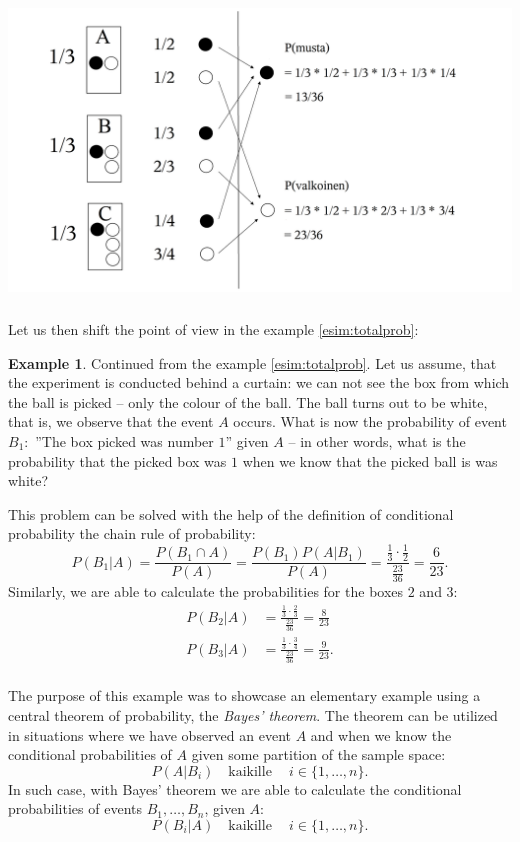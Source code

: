\documentclass[12pt,a4paper,leqno]{report}
\theoremstyle{plain}
\theoremstyle{definition}
\newtheorem{esim}[equation]{Example}
\begin{document}
\begin{center}
\includegraphics[height = 8cm]{bayes1.png}
\label{kuva:bayes}
\end{center}

Let us then shift the point of view in the example \ref{esim:totalprob}:

\begin{esim}
Continued from the example \ref{esim:totalprob}. Let us assume, that the experiment is conducted behind a curtain: we can not see the box from which the ball is picked -- only the colour of the ball. The ball turns out to be white, that is, we observe that the event $A$ occurs. What is now the probability of event $B_1:$ ''The box picked was number $1$'' given $A$ -- in other words, what is the probability that the picked box was $1$ when we know that the picked ball is was white?

This problem can be solved with the help of the definition of conditional probability  the chain rule of probability:
\[
P(B_1 | A) = \frac{P(B_1\cap A)}{P(A)} = \frac{P(B_1)P(A|B_1)}{P(A)} = \frac{\frac{1}{3} \cdot \frac{1}{2}}{\frac{23}{36}} = \frac{6}{23}. 
\]
Similarly, we are able to calculate the probabilities for the boxes $2$ and $3$:
\[
\begin{split}
P(B_2 | A) &= \frac{\frac{1}{3} \cdot \frac{2}{3}}{\frac{23}{36}} = \frac{8}{23} \\
P(B_3 | A) &= \frac{\frac{1}{3} \cdot \frac{3}{4}}{\frac{23}{36}} = \frac{9}{23}. \\
\end{split}
\]
\end{esim}

The purpose of this example was to showcase an elementary example using a central theorem of probability, the \emph{Bayes' theorem}. The theorem can be utilized in situations where we have observed an event $A$ and when we know the conditional probabilities of $A$ given some partition of the sample space:
\[
P(A|B_i) \quad \text{kaikille} \quad \ i \in \{1, \dots , n\}.
\]
In such case, with Bayes' theorem we are able to calculate the conditional probabilities of events $B_1, \dots , B_n$, given $A$:
\[
P(B_i|A) \quad \text{kaikille} \quad \ i \in \{1, \dots , n\}.
\]
\end{document}
